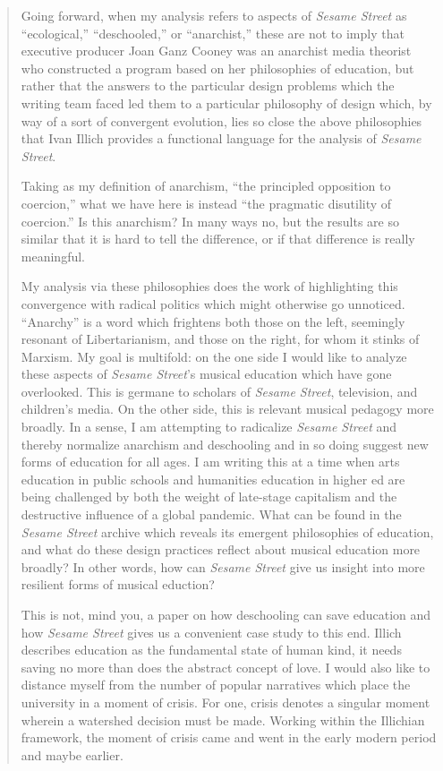 \documentclass[12pt,letterpaper]{article}
\newcommand{\ses}{\textit{Sesame Street }}
\begin{document}
\begin{quote}
	Going forward, when my analysis refers to aspects of \ses as 
	``ecological,'' ``deschooled,'' or ``anarchist,'' these are not to imply
	that executive producer Joan Ganz Cooney was an anarchist media theorist
	who 
	constructed a program based on her philosophies of education, but rather 	that the answers to the particular design problems which the writing 
	team faced led them to a particular philosophy of design which, by way 	
	of a sort of convergent evolution, lies so close the above philosophies 
	that Ivan Illich provides a functional language for the analysis of 
	\textit{Sesame Street}.

	Taking as my definition of anarchism, ``the principled opposition to 
	coercion,'' what we have here is instead ``the pragmatic disutility of 
	coercion.'' Is this anarchism? In many ways no, but the results 
	are so similar that it is hard to tell the difference, or if that 
	difference is really meaningful.

	My analysis via these philosophies does the work of highlighting this 
	convergence with radical politics which might otherwise go unnoticed. 
	``Anarchy'' is a word which frightens both those on the left, seemingly
	 resonant of Libertarianism, and those on the right, for whom it stinks 
	of Marxism. My goal is multifold: on the one side I would like to 
	analyze these aspects of \textit{Sesame Street}’s musical education 
	which have gone overlooked. This is germane to scholars of 
	\textit{Sesame Street}, television, and children’s media. On the other 
	side, this is relevant musical pedagogy more broadly. In a sense,
 	I am attempting to radicalize \ses and thereby normalize anarchism and 
	deschooling and in so doing suggest new forms of education for all ages. 
	I am writing this at a time when arts education in public schools and 
	humanities education in higher ed are being challenged by both the 
	weight of late-stage capitalism and the destructive influence of a 
	global pandemic. What can be found in the \ses archive which 
	reveals its emergent philosophies of education, and what do these design 	practices reflect about musical education more broadly? In other words, 	how can \ses give us insight into more resilient forms of musical 
	eduction?

	This is not, mind you, a paper on how deschooling can save education and
 	how \ses gives us a convenient case study to this end. Illich 
	describes education as the fundamental state of human kind, it needs 
	saving no more than does the abstract concept of love. I would also like 	to distance myself from the number of popular narratives which place the 	university in a moment of crisis. For one, crisis denotes a singular 
	moment wherein a watershed decision must be made. Working within the 
	Illichian framework, the moment of crisis came and went in the early 
	modern period and maybe earlier.


\end{quote}
\end{document}
